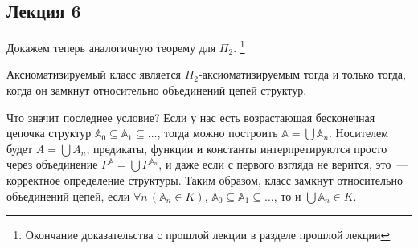 \subsection{Лекция 6}

Докажем теперь аналогичную теорему для $\Pi_2$. \footnote{Окончание доказательства с прошлой лекции в разделе прошлой лекции} \\ 

\begin{theorem} %
    Аксиоматизируемый класс является $\Pi_2$-аксиоматизируемым тогда и только тогда, когда он замкнут относительно объединений цепей структур.
\end{theorem}

\begin{remark}
    Что значит последнее условие? Если у нас есть возрастающая бесконечная цепочка структур $\mathbb{A}_0 \subseteq \mathbb{A}_1 \subseteq \ldots$, тогда можно построить $\mathbb{A} = \bigcup \mathbb{A}_n$. Носителем будет $A = \bigcup A_n$, предикаты, функции  и константы интерпретируются просто через объединение $P^{\mathbb{A}} = \bigcup P^{\mathbb{A}_n}$, и даже если с первого взгляда не верится, это~— корректное определение структуры. Таким образом, класс замкнут относительно объединений цепей, если $\forall n\,(\mathbb{A}_n \in K)$, $\mathbb{A}_0 \subseteq \mathbb{A}_1 \subseteq \ldots$, то и $\bigcup \mathbb{A}_n \in K$. 
\end{remark}

